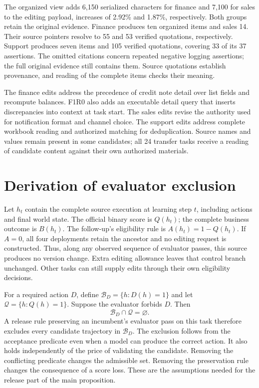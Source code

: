 \documentclass{ecai}
\begin{document}
The organized view adds 6,150 serialized characters for finance and 7,100 for sales to the editing payload, increases of 2.92\% and 1.87\%, respectively. Both groups retain the original evidence. Finance produces ten organized items and sales 14. Their source pointers resolve to 55 and 53 verified quotations, respectively. Support produces seven items and 105 verified quotations, covering 33 of its 37 assertions. The omitted citations concern repeated negative logging assertions; the full original evidence still contains them. Source quotations establish provenance, and reading of the complete items checks their meaning.

The finance edits address the precedence of credit note detail over list fields and recompute balances. F1R0 also adds an executable detail query that inserts discrepancies into context at task start. The sales edits revise the authority used for notification format and channel choice. The support edits address complete workbook reading and authorized matching for deduplication. Source names and values remain present in some candidates; all 24 transfer tasks receive a reading of candidate content against their own authorized materials.

\section{Derivation of evaluator exclusion}
\label{sec:exclusion-proof}

Let $h_t$ contain the complete source execution at learning step $t$, including actions and final world state. The official binary score is $Q(h_t)$; the complete business outcome is $B(h_t)$. The follow-up's eligibility rule is $A(h_t)=1-Q(h_t)$. If $A=0$, all four deployments retain the ancestor and no editing request is constructed. Thus, along any observed sequence of evaluator passes, this source produces no version change. Extra editing allowance leaves that control branch unchanged. Other tasks can still supply edits through their own eligibility decisions.

For a required action $D$, define $\mathcal B_D=\{h:D(h)=1\}$ and let $\mathcal Q=\{h:Q(h)=1\}$. Suppose the evaluator forbids $D$. Then
\begin{equation}
\mathcal B_D\cap\mathcal Q=\varnothing.
\end{equation}
A release rule preserving an incumbent's evaluator pass on this task therefore excludes every candidate trajectory in $\mathcal B_D$. The exclusion follows from the acceptance predicate even when a model can produce the correct action. It also holds independently of the price of validating the candidate. Removing the conflicting predicate changes the admissible set. Removing the preservation rule changes the consequence of a score loss. These are the assumptions needed for the release part of the main proposition.
\end{document}
